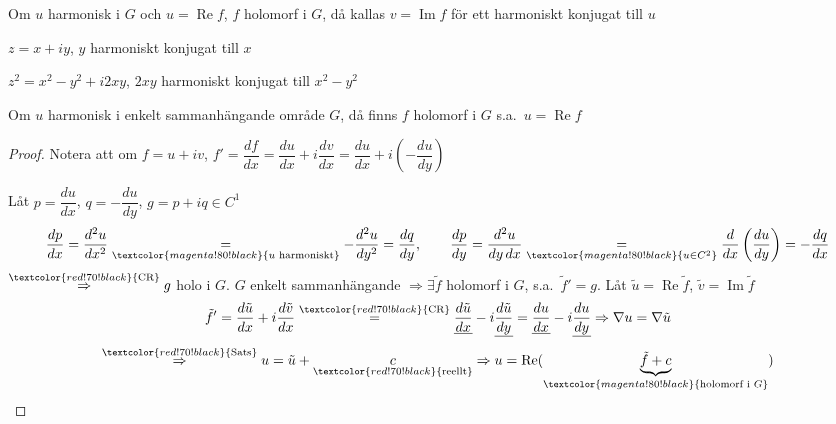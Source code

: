 \begin{definition}
Om $u$ harmonisk i $G$ och $u = \operatorname{Re} f$, $f$ holomorf i $G$, då kallas $v = \operatorname{Im} f$ för ett harmoniskt konjugat till $u$
\end{definition}

\begin{example}
$z = x + iy$, $y$ harmoniskt konjugat till $x$

$z^2 = x^2 - y^2 + i2xy$, $2xy$ harmoniskt konjugat till $x^2 - y^2$
\end{example}

\begin{theorem}[Sats 6.6]
Om $u$ harmonisk i enkelt sammanhängande område $G$, då finns $f$ holomorf i $G$ s.a.\ $u = \operatorname{Re} f$
\end{theorem}
\begin{proof}
Notera att om $f = u + iv$, $f' = \dfrac{df}{dx} = \dfrac{du}{dx} + i\dfrac{dv}{dx} = \dfrac{du}{dx} + i\left( -\dfrac{du}{dy} \right)$ \textcolor{magenta!80!black}{}

Låt $p = \dfrac{du}{dx}$, $q = -\dfrac{du}{dy}$, $g = p + iq \in C^1$
\[ \frac{dp}{dx} = \frac{d^2u}{dx^2} \underset{\textcolor{magenta!80!black}{u \text{ harmoniskt}}}{=} -\frac{d^2u}{dy^2} = \frac{dq}{dy}, \qquad \frac{dp}{dy} = \frac{d^2u}{dy\,dx} \underset{\textcolor{magenta!80!black}{u \in C^2}}{=} \frac{d}{dx}\left( \frac{du}{dy} \right) = -\frac{dq}{dx} \]
$\overset{\textcolor{red!70!black}{\text{CR}}}{\Rightarrow} g$ holo i $G$. $G$ enkelt sammanhängande $\Rightarrow \exists \tilde{f}$ holomorf i $G$, s.a.\ $\tilde{f}' = g$. Låt $\tilde{u} = \operatorname{Re} \tilde{f}$, $\tilde{v} = \operatorname{Im} \tilde{f}$
\[ \tilde{f}' = \frac{d\tilde{u}}{dx} + i\frac{d\tilde{v}}{dx} \overset{\textcolor{red!70!black}{\text{CR}}}{=} \underline{\frac{d\tilde{u}}{dx}} - i\underline{\frac{d\tilde{u}}{dy}} = \underline{\frac{du}{dx}} - i\underline{\frac{du}{dy}} \Rightarrow \nabla u = \nabla \tilde{u} \]
\[ \overset{\textcolor{red!70!black}{\text{Sats}}}{\Rightarrow} u = \tilde{u} + \underset{\textcolor{red!70!black}{\text{reellt}}}{c} \Rightarrow u = \operatorname{Re}(\underbrace{\tilde{f} + c}_{\textcolor{magenta!80!black}{\text{holomorf i } G}}) \]
\end{proof}
